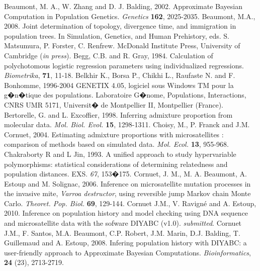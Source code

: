\begin{thebibliography}{a}
 Beaumont, M. A., W. Zhang and D. J. Balding, 2002. Approximate Bayesian Computation in Population Genetics. \emph{Genetics} \textbf{162}, 2025-2035.
Beaumont, M.A., 2008. Joint determination of topology, divergence time, and immigration in population trees. In Simulation, Genetics, and Human Prehistory, eds. S. Matsumura, P. Forster,  C. Renfrew. McDonald Institute Press, University of Cambridge (\emph{in press}).
 Begg, C.B. and R. Gray, 1984. Calculation of polychotomous logistic regression parameters using individualized regressions. \emph{Biometrika},
\textbf{71}, 11-18.
 Belkhir K., Borsa P., Chikhi L., Raufaste N. and F. Bonhomme, 1996-2004 GENETIX 4.05, logiciel sous Windows TM pour la g�n�tique des populations. Laboratoire G�nome, Populations, Interactions, CNRS UMR 5171, Universit� de Montpellier II, Montpellier (France).
 Bertorelle, G. and L. Excoffier, 1998. Inferring admixture proportion from molecular data. \emph{Mol. Biol. Evol.} \textbf{15}, 1298-1311.
 Choisy, M., P. Franck and J.M. Cornuet, 2004. Estimating admixture proportions with microsatellites : comparison of methods based on simulated data. \emph{Mol. Ecol.} \textbf{13}, 955-968.
Chakraborty R and L Jin, 1993. A unified approach to study hypervariable polymorphisms: statistical considerations of determining relatedness and population distances. EXS. \emph{67}, 153�175.
 Cornuet, J. M.,
M. A. Beaumont, A. Estoup and M. Solignac, 2006. Inference on
microsatellite mutation processes in the invasive mite, \emph{Varroa
destructor}, using reversible jump Markov chain Monte Carlo.
\emph{Theoret. Pop. Biol.} \textbf{69}, 129-144.
Cornuet J.M., V. Ravign\'e and A. Estoup, 2010. Inference on population history and model checking using DNA sequence and microsatellite data with the sofware DIYABC (v1.0). \emph{submitted}. 
Cornuet J.M., F. Santos, M.A. Beaumont, C.P. Robert, J.M. Marin, D.J. Balding, T. Guillemaud and A. Estoup, 2008. Infering population history with DIYABC: a user-friendly approach to Approximate Bayesian Computations. \emph{Bioinformatics}, \textbf{24} (23), 2713-2719.


\end{thebibliography}
